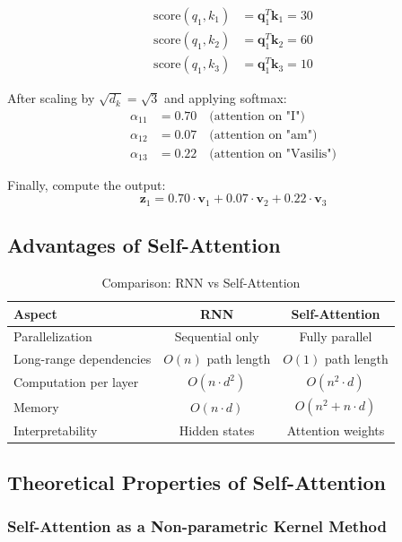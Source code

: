 \documentclass[11pt]{article}
\begin{document}
\begin{align}
\text{score}(q_1, k_1) &= \mathbf{q}_1^T \mathbf{k}_1 = 30 \\
\text{score}(q_1, k_2) &= \mathbf{q}_1^T \mathbf{k}_2 = 60 \\
\text{score}(q_1, k_3) &= \mathbf{q}_1^T \mathbf{k}_3 = 10
\end{align}

After scaling by $\sqrt{d_k} = \sqrt{3}$ and applying softmax:
\begin{align}
\alpha_{11} &= 0.70 \quad \text{(attention on "I")} \\
\alpha_{12} &= 0.07 \quad \text{(attention on "am")} \\
\alpha_{13} &= 0.22 \quad \text{(attention on "Vasilis")}
\end{align}

Finally, compute the output:
\begin{equation}
\mathbf{z}_1 = 0.70 \cdot \mathbf{v}_1 + 0.07 \cdot \mathbf{v}_2 + 0.22 \cdot \mathbf{v}_3
\end{equation}

\subsection{Advantages of Self-Attention}

\begin{table}[H]
\centering
\caption{Comparison: RNN vs Self-Attention}
\begin{tabular}{l c c}
\toprule
\textbf{Aspect} & \textbf{RNN} & \textbf{Self-Attention} \\
\midrule
Parallelization & Sequential only & Fully parallel \\
Long-range dependencies & $O(n)$ path length & $O(1)$ path length \\
Computation per layer & $O(n \cdot d^2)$ & $O(n^2 \cdot d)$ \\
Memory & $O(n \cdot d)$ & $O(n^2 + n \cdot d)$ \\
Interpretability & Hidden states & Attention weights \\
\bottomrule
\end{tabular}
\end{table}

\subsection{Theoretical Properties of Self-Attention}

\subsubsection{Self-Attention as a Non-parametric Kernel Method}
\end{document}
